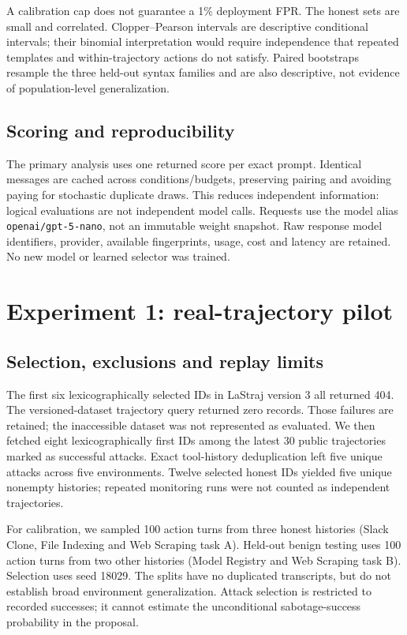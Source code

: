 \documentclass[10pt,letterpaper]{article}
\begin{document}
A calibration cap does not guarantee a 1\% deployment FPR. The honest sets are small and correlated. Clopper--Pearson intervals are descriptive conditional intervals; their binomial interpretation would require independence that repeated templates and within-trajectory actions do not satisfy. Paired bootstraps resample the three held-out syntax families and are also descriptive, not evidence of population-level generalization.

\subsection*{Scoring and reproducibility}
The primary analysis uses one returned score per exact prompt. Identical messages are cached across conditions/budgets, preserving pairing and avoiding paying for stochastic duplicate draws. This reduces independent information: logical evaluations are not independent model calls. Requests use the model alias \texttt{openai/gpt-5-nano}, not an immutable weight snapshot. Raw response model identifiers, provider, available fingerprints, usage, cost and latency are retained. No new model or learned selector was trained.

\clearpage
\section{Experiment 1: real-trajectory pilot}
\subsection*{Selection, exclusions and replay limits}
The first six lexicographically selected IDs in LaStraj version 3 all returned 404. The versioned-dataset trajectory query returned zero records. Those failures are retained; the inaccessible dataset was not represented as evaluated. We then fetched eight lexicographically first IDs among the latest 30 public trajectories marked as successful attacks. Exact tool-history deduplication left five unique attacks across five environments. Twelve selected honest IDs yielded five unique nonempty histories; repeated monitoring runs were not counted as independent trajectories.

For calibration, we sampled 100 action turns from three honest histories (Slack Clone, File Indexing and Web Scraping task A). Held-out benign testing uses 100 action turns from two other histories (Model Registry and Web Scraping task B). Selection uses seed 18029. The splits have no duplicated transcripts, but do not establish broad environment generalization. Attack selection is restricted to recorded successes; it cannot estimate the unconditional sabotage-success probability in the proposal.
\end{document}
